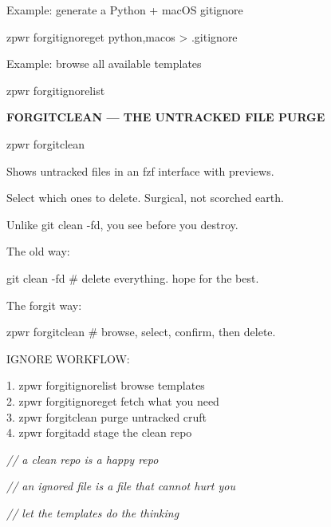 \documentclass[11pt,a4paper,twoside]{book}
\begin{document}
Example: generate a Python + macOS gitignore

\begin{codebox}
zpwr forgitignoreget python,macos > .gitignore\\
\end{codebox}

Example: browse all available templates

\begin{codebox}
zpwr forgitignorelist\\
\end{codebox}


\vspace{12pt}
{\bfseries\color{neonyellow} FORGITCLEAN — THE UNTRACKED FILE PURGE}\vspace{4pt}

\begin{codebox}
zpwr forgitclean\\
\end{codebox}

Shows untracked files in an fzf interface with previews.

Select which ones to delete. Surgical, not scorched earth.

Unlike git clean -fd, you see before you destroy.

The old way:

git clean -fd    \# delete everything. hope for the best.

The forgit way:

\begin{codebox}
zpwr forgitclean  \# browse, select, confirm, then delete.\\
\end{codebox}

IGNORE WORKFLOW:

\begin{codebox}
1. zpwr forgitignorelist    browse templates\\
2. zpwr forgitignoreget     fetch what you need\\
3. zpwr forgitclean         purge untracked cruft\\
4. zpwr forgitadd           stage the clean repo\\
\end{codebox}

{\small\itshape\color{dimtext} // a clean repo is a happy repo}

{\small\itshape\color{dimtext} // an ignored file is a file that cannot hurt you}

{\small\itshape\color{dimtext} // let the templates do the thinking}
\end{document}
